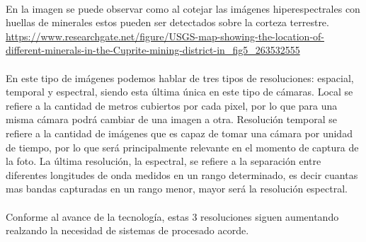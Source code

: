 \\
En la imagen se puede observar como al cotejar las imágenes hiperespectrales con huellas de minerales estos pueden ser detectados sobre la corteza terrestre.
\\
\url{https://www.researchgate.net/figure/USGS-map-showing-the-location-of-different-minerals-in-the-Cuprite-mining-district-in_fig5_263532555}
\\
\\
En este tipo de imágenes podemos hablar de tres tipos de resoluciones: espacial, temporal y espectral, siendo esta última única en este tipo de cámaras. Local se refiere a la cantidad de metros cubiertos por cada pixel, por lo que para una misma cámara podrá cambiar de una imagen a otra. Resolución temporal se refiere a la cantidad de imágenes que es capaz de tomar una cámara por unidad de tiempo, por lo que será principalmente relevante en el momento de captura de la foto. La última resolución, la espectral, se refiere a la separación entre diferentes longitudes de onda medidos en un rango determinado, es decir cuantas mas bandas capturadas en un rango menor, mayor será la resolución espectral.
\\
\\
Conforme al avance de la tecnología, estas 3 resoluciones siguen aumentando realzando la necesidad de sistemas de procesado acorde.

